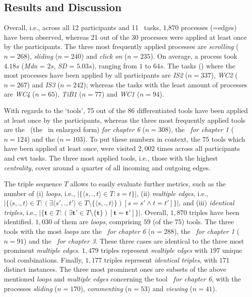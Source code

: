 \subsection{Results and Discussion} \label{sec:cwt-results}
%
Overall, i.e., across all 12 participants and 11 \cwt\ tasks, 1,870 processes (=edges) have been observed, whereas 21 out of the 30 processes were applied at least once by the participants. The three most frequently applied processes are \emph{scrolling} ($n = 268$), \emph{sliding} ($n = 240$) and \emph{click on} ($n = 235$). 
%
On average, a process took $4.18 \unit{s}$ (\emph{Mdn} = $2 \unit{s}$, \emph{SD} = $5.03 \unit{s}$), ranging from $1$ to $64 \unit{s}$. 
%
The tasks () where the most processes have been applied by all participants are \emph{IS2} ($n = 337$), \emph{WC2} ($n = 267$) and \emph{IS3} ($n = 242$); whereas the tasks with the least amount of processes are \emph{WC4} ($n = 65$), \emph{TiB1} ($n = 77$) and \emph{WC1} ($n = 94$). 

With regards to the `tools', 75 out of the 86 differentiated tools have been applied at least once by the participants, whereas the three most frequently applied tools are the \emph{\isL}\ (the \ImageSlider\ in enlarged form) \emph{for chapter 6} ($n = 308$), the \emph{\snps\ for chapter 1} ($n = 124$) and the \emph{\Searchbar} ($n = 103$). 
%
To put these numbers in context, the $75$ tools which have been applied at least once, were visited $2,002$ times across all participants and \acrshort{cwt} tasks. 
%
The three most applied tools, i.e., those with the highest \emph{centrality}, cover around a quarter of all incoming and outgoing edges.


The triple sequence $T$ allows to easily evaluate further metrics, such as the number of
(i) \emph{loops}, i.e., $|\{\langle s, ., t \rangle \in T : s = t \}|$,
(ii) \emph{multiple edges}, i.e., $|\{\langle s, ., t \rangle \in T : (\exists \langle s', ., t' \rangle \in T\setminus \{\langle s, ., t \rangle\})[s = s' \wedge t = t']\}|$,
and (iii) \emph{identical triples}, i.e., 
$|\{\mathbf{t} \in T : (\exists \mathbf{t}' \in T\setminus \{\mathbf{t}\})[\mathbf{t} = \mathbf{t}']\}|$.
% 
Overall, $1,870$ triples have been identified. 
%
$1,030$ of them are \emph{loops}, comprising $59$ (of the $75$) tools. 
%
The three tools with the most \emph{loops} are the \emph{\isL\ for chapter 6} ($n = 288$), the \emph{\snps\ for chapter 1} ($n = 91$) and the \emph{\snps\ for chapter 3}. 
%
These three cases are identical to the three most prominent \emph{multiple edges}. $1,479$ triples represent \emph{multiple edges} with $197$ unique tool combinations.
%
Finally, $1,177$ triples represent \emph{identical triples}, with $171$ distinct instances. 
%
The three most prominent ones are subsets of the above mentioned \emph{loops} and \emph{multiple edges} concerning the tool \emph{\isL\ for chapter 6}, with the processes \emph{sliding} ($n = 170$), \emph{commenting} ($n = 53$) and \emph{viewing} ($n = 41$). 


